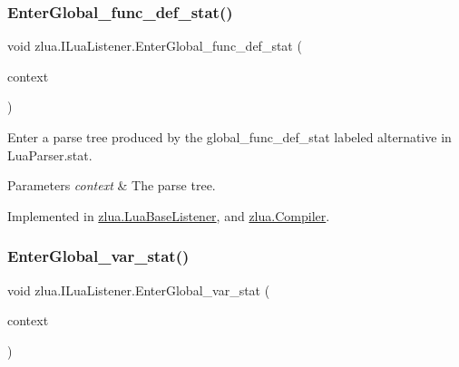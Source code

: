 \subsubsection{\texorpdfstring{Enter\+Global\+\_\+func\+\_\+def\+\_\+stat()}{EnterGlobal\_func\_def\_stat()}}
{\footnotesize\ttfamily void zlua.\+I\+Lua\+Listener.\+Enter\+Global\+\_\+func\+\_\+def\+\_\+stat (\begin{DoxyParamCaption}\item[{\mbox{[}\+Not\+Null\mbox{]} \mbox{\hyperlink{classzlua_1_1_lua_parser_1_1_global__func__def__stat_context}{Lua\+Parser.\+Global\+\_\+func\+\_\+def\+\_\+stat\+Context}}}]{context }\end{DoxyParamCaption})}



Enter a parse tree produced by the {\ttfamily global\+\_\+func\+\_\+def\+\_\+stat} labeled alternative in Lua\+Parser.\+stat. 


\begin{DoxyParams}{Parameters}
{\em context} & The parse tree.\\
\hline
\end{DoxyParams}


Implemented in \mbox{\hyperlink{classzlua_1_1_lua_base_listener_a26ccde71c2f917da169f16fa1dea9ecc}{zlua.\+Lua\+Base\+Listener}}, and \mbox{\hyperlink{classzlua_1_1_compiler_a895f16e966c211610d41e577ea359ed4}{zlua.\+Compiler}}.

\mbox{\label{interfacezlua_1_1_i_lua_listener_a7a5992193e5625f3c6d07fcc05f3ce4c}} 
\subsubsection{\texorpdfstring{Enter\+Global\+\_\+var\+\_\+stat()}{EnterGlobal\_var\_stat()}}
{\footnotesize\ttfamily void zlua.\+I\+Lua\+Listener.\+Enter\+Global\+\_\+var\+\_\+stat (\begin{DoxyParamCaption}\item[{\mbox{[}\+Not\+Null\mbox{]} \mbox{\hyperlink{classzlua_1_1_lua_parser_1_1_global__var__stat_context}{Lua\+Parser.\+Global\+\_\+var\+\_\+stat\+Context}}}]{context }\end{DoxyParamCaption})}



